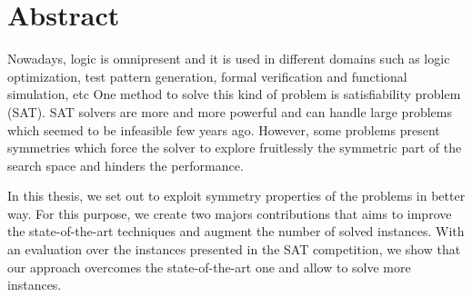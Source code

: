 
\chapter*{Abstract}

Nowadays, logic is omnipresent and it is used in different domains such as logic optimization, test pattern generation, formal verification and functional simulation, etc
One method to solve this kind of problem is satisfiability problem (SAT).
SAT solvers are more and more powerful and can handle large problems which seemed to be infeasible 
few years ago. However, some problems present symmetries which force the solver to explore fruitlessly
the symmetric part of the search space and hinders the performance. 

In this thesis, we set out to exploit symmetry properties of the problems in better way.
For this purpose, we create two majors contributions that aims to improve the state-of-the-art techniques and augment the number of solved instances. With an evaluation over the instances presented in the SAT competition, we show that our approach overcomes the state-of-the-art one and allow to solve more instances. 

